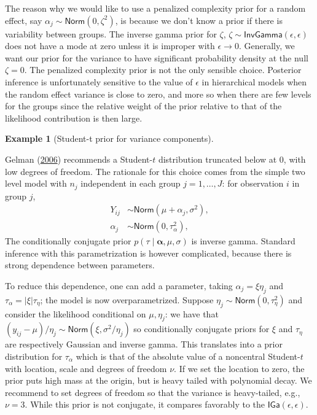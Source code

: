 \documentclass[
  11pt,
  letterpaper,
]{scrbook}
\theoremstyle{definition}
\newtheorem{example}{Example}[chapter]
\theoremstyle{definition}
\theoremstyle{definition}
\theoremstyle{plain}
\theoremstyle{remark}
\begin{document}
The reason why we would like to use a penalized complexity prior for a
random effect, say \(\alpha_j \sim \mathsf{Norm}(0, \zeta^2)\), is
because we don't know a prior if there is variability between groups.
The inverse gamma prior for \(\zeta\),
\(\zeta \sim \mathsf{InvGamma}(\epsilon, \epsilon)\) does not have a
mode at zero unless it is improper with \(\epsilon \to 0\). Generally,
we want our prior for the variance to have significant probability
density at the null \(\zeta=0\). The penalized complexity prior is not
the only sensible choice. Posterior inference is unfortunately sensitive
to the value of \(\epsilon\) in hierarchical models when the random
effect variance is close to zero, and more so when there are few levels
for the groups since the relative weight of the prior relative to that
of the likelihood contribution is then large.

\begin{example}[Student-t prior for variance
components]\protect\hypertarget{exm-random-effect-variance}{}\label{exm-random-effect-variance}

Gelman (\protect\hyperlink{ref-Gelman:2006}{2006}) recommends a
Student-\(t\) distribution truncated below at \(0\), with low degrees of
freedom. The rationale for this choice comes from the simple two level
model with \(n_j\) independent in each group \(j=1, \ldots, J\): for
observation \(i\) in group \(j\), \begin{align*}
Y_{ij} &\sim \mathsf{Norm}(\mu + \alpha_j, \sigma^2),\\
\alpha_j &\sim \mathsf{Norm}(0, \tau^2_\alpha), 
\end{align*} The conditionally conjugate prior
\(p(\tau \mid \boldsymbol{\alpha}, \mu, \sigma)\) is inverse gamma.
Standard inference with this parametrization is however complicated,
because there is strong dependence between parameters.

To reduce this dependence, one can add a parameter, taking
\(\alpha_j = \xi \eta_j\) and \(\tau_\alpha=|\xi|\tau_{\eta}\); the
model is now overparametrized. Suppose
\(\eta_j \sim \mathsf{Norm}(0, \tau^2_\eta)\) and consider the
likelihood conditional on \(\mu, \eta_j\): we have that
\((y_{ij} - \mu)/\eta_j \sim \mathsf{Norm}(\xi, \sigma^2/\eta_j)\) so
conditionally conjugate priors for \(\xi\) and \(\tau_\eta\) are
respectively Gaussian and inverse gamma. This translates into a prior
distribution for \(\tau_\alpha\) which is that of the absolute value of
a noncentral Student-\(t\) with location, scale and degrees of freedom
\(\nu\). If we set the location to zero, the prior puts high mass at the
origin, but is heavy tailed with polynomial decay. We recommend to set
degrees of freedom so that the variance is heavy-tailed, e.g.,
\(\nu=3\). While this prior is not conjugate, it compares favorably to
the \(\mathsf{IGa}(\epsilon, \epsilon)\).

\end{example}
\end{document}
